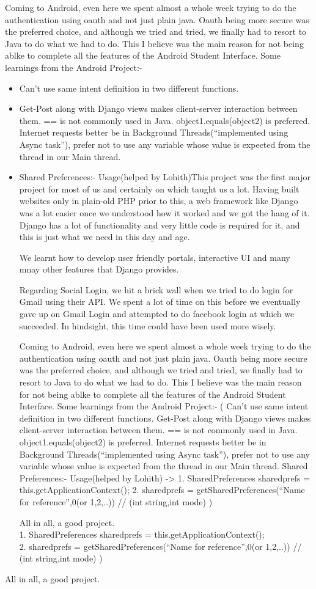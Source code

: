 \documentclass[11pt]{report}
\begin{document}
	Coming to Android, even here we spent almost a whole week trying to do the authentication using oauth and not just plain java. Oauth being more secure was the preferred choice, and although we tried and tried, we finally had to resort to Java to do what we had to do. This I believe was the main reason for not being ablke to complete all the features of the Android Student Interface.
	Some learnings from the Android Project:-
	\begin{itemize}
	\item	Can’t use same intent definition in two different functions.
	\item Get-Post along with Django views makes client-server interaction between them.
		== is not commonly used in Java. object1.equals(object2) is preferred.
		Internet requests better be in Background Threads(“implemented using Async task”), prefer not to use any variable whose value is 	expected from the thread in our Main thread.
	\item Shared Preferences:- Usage(helped by Lohith)This project was the first major project for most of us and certainly on which taught us a lot. Having built websites only in plain-old PHP prior to this, a web framework like Django was a lot easier once we understood how it worked and we got the hang of it. Django has a lot of functionality and very little code is required for it, and this is just what we need in this day and age.

	We learnt how to develop user friendly portals, interactive UI and many mnay other features that Django provides.

	Regarding Social Login, we hit a brick wall when we tried to do login for Gmail using their API. We spent a lot of time on this before we eventually gave up on Gmail Login and attempted to do facebook login at which we succeeded. In hindsight, this time could have been used more wisely.

	Coming to Android, even here we spent almost a whole week trying to do the authentication using oauth and not just plain java. Oauth being more secure was the preferred choice, and although we tried and tried, we finally had to resort to Java to do what we had to do. This I believe was the main reason for not being ablke to complete all the features of the Android Student Interface.
	Some learnings from the Android Project:-
	(
		Can’t use same intent definition in two different functions.
		Get-Post along with Django views makes client-server interaction between them.
		== is not commonly used in Java. object1.equals(object2) is preferred.
		Internet requests better be in Background Threads(“implemented using Async task”), prefer not to use any variable whose value is 	expected from the thread in our Main thread.
		Shared Preferences:- Usage(helped by Lohith) ->
		1. SharedPreferences sharedprefs = this.getApplicationContext();
		2. sharedprefs = getSharedPreferences(“Name for reference”,0(or 1,2,..)) // (int string,int mode)
	)

	All in all, a good project. \\ 
		1. SharedPreferences sharedprefs = this.getApplicationContext(); \\ 
		2. sharedprefs = getSharedPreferences(“Name for reference”,0(or 1,2,..)) // (int string,int mode)
	) \\ 
	\end{itemize}
	All in all, a good project.
\end{document}
